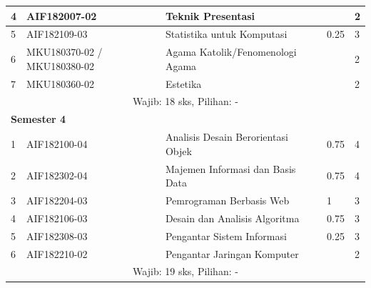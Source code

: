 \begin{table}[H]
\begin{tabular}{|p{0.5cm}|p{2.85cm}|p{4.95cm}|p{2.7cm}|p{2.7cm}|}
			4 &	AIF182007-02 &	Teknik Presentasi &  &	2  \\ \hline
			5 &	AIF182109-03 &	Statistika untuk Komputasi &	0.25 &	3  \\ \hline
			6 &	MKU180370-02 / MKU180380-02 &	Agama Katolik/Fenomenologi Agama & &	2  \\ \hline
			7 &	MKU180360-02 &	Estetika & &	2  \\ \hline
			\multicolumn{5}{|c|}{Wajib: 18 sks, Pilihan: -} \\ \hline
			\multicolumn{5}{|l|}{\textbf{Semester 4}} \\ \hline
			1	& AIF182100-04 &	Analisis Desain Berorientasi Objek &	0.75 &	4  \\ \hline
			2	& AIF182302-04 &	Majemen Informasi dan Basis Data &	0.75 &	4  \\ \hline
			3	& AIF182204-03 &	Pemrograman Berbasis Web &	1 &	3  \\ \hline
			4	& AIF182106-03 &	Desain dan Analisis Algoritma &	0.75 &	3  \\ \hline
			5 &	AIF182308-03 &	Pengantar Sistem Informasi &	0.25 &	3  \\ \hline
			6 &	AIF182210-02 &	Pengantar Jaringan Komputer &	&	2  \\ \hline
			\multicolumn{5}{|c|}{Wajib: 19 sks, Pilihan: -} \\ \hline
		\end{tabular}
	\label{tab:strukturkurikulum2018}
\end{table}

